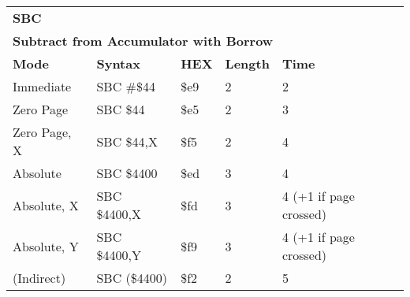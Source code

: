 \begin{table}[H]
\begin{tabular}{p{}p{}p{}p{}p{}}
\multicolumn{5}{p{0.22\textwidth}}{\huge\textbf{SBC}}\\
\multicolumn{5}{p{0.9\textwidth}}{\textbf{Subtract from Accumulator with Borrow}}\\ \hline
\multicolumn{1}{|p{0.22\textwidth}|}{\textbf{Mode}}&\multicolumn{1}{|p{0.2\textwidth}|}{\textbf{Syntax}}&\multicolumn{1}{|p{0.1\textwidth}|}{\textbf{HEX}}&\multicolumn{1}{|p{0.1\textwidth}|}{\textbf{Length}}&\multicolumn{1}{|p{0.4\textwidth}|}{\textbf{Time}}\\ \hline
\multicolumn{1}{|p{0.22\textwidth}|}{Immediate}&\multicolumn{1}{|p{0.2\textwidth}|}{SBC \#\$44}&\multicolumn{1}{|p{0.1\textwidth}|}{\$e9}&\multicolumn{1}{|p{0.1\textwidth}|}{2}&\multicolumn{1}{|p{0.4\textwidth}|}{2}\\ \hline
\multicolumn{1}{|p{0.22\textwidth}|}{Zero Page}&\multicolumn{1}{|p{0.2\textwidth}|}{SBC \$44}&\multicolumn{1}{|p{0.1\textwidth}|}{\$e5}&\multicolumn{1}{|p{0.1\textwidth}|}{2}&\multicolumn{1}{|p{0.4\textwidth}|}{3}\\ \hline
\multicolumn{1}{|p{0.22\textwidth}|}{Zero Page, X}&\multicolumn{1}{|p{0.2\textwidth}|}{SBC \$44,X}&\multicolumn{1}{|p{0.1\textwidth}|}{\$f5}&\multicolumn{1}{|p{0.1\textwidth}|}{2}&\multicolumn{1}{|p{0.4\textwidth}|}{4}\\ \hline
\multicolumn{1}{|p{0.22\textwidth}|}{Absolute}&\multicolumn{1}{|p{0.2\textwidth}|}{SBC \$4400}&\multicolumn{1}{|p{0.1\textwidth}|}{\$ed}&\multicolumn{1}{|p{0.1\textwidth}|}{3}&\multicolumn{1}{|p{0.4\textwidth}|}{4}\\ \hline
\multicolumn{1}{|p{0.22\textwidth}|}{Absolute, X}&\multicolumn{1}{|p{0.2\textwidth}|}{SBC \$4400,X}&\multicolumn{1}{|p{0.1\textwidth}|}{\$fd}&\multicolumn{1}{|p{0.1\textwidth}|}{3}&\multicolumn{1}{|p{0.4\textwidth}|}{4 (+1 if page crossed)}\\ \hline
\multicolumn{1}{|p{0.22\textwidth}|}{Absolute, Y}&\multicolumn{1}{|p{0.2\textwidth}|}{SBC \$4400,Y}&\multicolumn{1}{|p{0.1\textwidth}|}{\$f9}&\multicolumn{1}{|p{0.1\textwidth}|}{3}&\multicolumn{1}{|p{0.4\textwidth}|}{4 (+1 if page crossed)}\\ \hline
\multicolumn{1}{|p{0.22\textwidth}|}{(Indirect)}&\multicolumn{1}{|p{0.2\textwidth}|}{SBC (\$4400)}&\multicolumn{1}{|p{0.1\textwidth}|}{\$f2}&\multicolumn{1}{|p{0.1\textwidth}|}{2}&\multicolumn{1}{|p{0.4\textwidth}|}{5}\\ \hline

\end{tabular}
\end{table}

